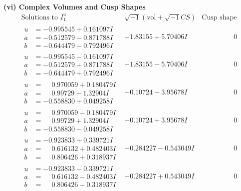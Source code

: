\documentclass[1p]{elsarticle_modified}
\theoremstyle{definition}
\newcommand{\I}{\sqrt{-1}}
\begin{document}
\newpage\flushleft \textbf{(vi) Complex Volumes and Cusp Shapes}
$$\begin{array}{c|c|c}  
\text{Solutions to }I^u_{1}& \I (\text{vol} + \sqrt{-1}CS) & \text{Cusp shape}\\
 \hline 
\begin{aligned}
u &= -0.995545 + 0.161097 I \\
a &= -0.512579 - 0.871788 I \\
b &= -0.644479 - 0.792496 I\end{aligned}
 & -1.83155 + 5.70406 I & \phantom{-0.000000 } 0 \\ \hline\begin{aligned}
u &= -0.995545 - 0.161097 I \\
a &= -0.512579 + 0.871788 I \\
b &= -0.644479 + 0.792496 I\end{aligned}
 & -1.83155 - 5.70406 I & \phantom{-0.000000 } 0 \\ \hline\begin{aligned}
u &= \phantom{-}0.970059 + 0.180479 I \\
a &= \phantom{-}0.99729 - 1.32904 I \\
b &= -0.558830 + 0.049258 I\end{aligned}
 & -0.10724 - 3.95678 I & \phantom{-0.000000 } 0 \\ \hline\begin{aligned}
u &= \phantom{-}0.970059 - 0.180479 I \\
a &= \phantom{-}0.99729 + 1.32904 I \\
b &= -0.558830 - 0.049258 I\end{aligned}
 & -0.10724 + 3.95678 I & \phantom{-0.000000 } 0 \\ \hline\begin{aligned}
u &= -0.923833 + 0.339721 I \\
a &= \phantom{-}0.616132 + 0.482403 I \\
b &= \phantom{-}0.806426 + 0.318937 I\end{aligned}
 & -0.284227 - 0.543049 I & \phantom{-0.000000 } 0 \\ \hline\begin{aligned}
u &= -0.923833 - 0.339721 I \\
a &= \phantom{-}0.616132 - 0.482403 I \\
b &= \phantom{-}0.806426 - 0.318937 I\end{aligned}
 & -0.284227 + 0.543049 I & \phantom{-0.000000 } 0 \\ \hline\begin{aligned}

\end{aligned}
\end{array}$$
\end{document}
